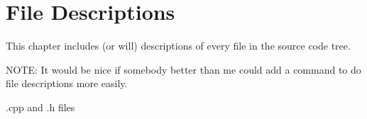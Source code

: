 \chapter{File Descriptions\label{cha:filedescribe}}

This chapter includes (or will) descriptions of every file in the source code tree. 

NOTE: It would be nice if somebody better than me could add a command to do file descriptions more easily.

\begin{section}{.cpp and .h files}



\end{section}
